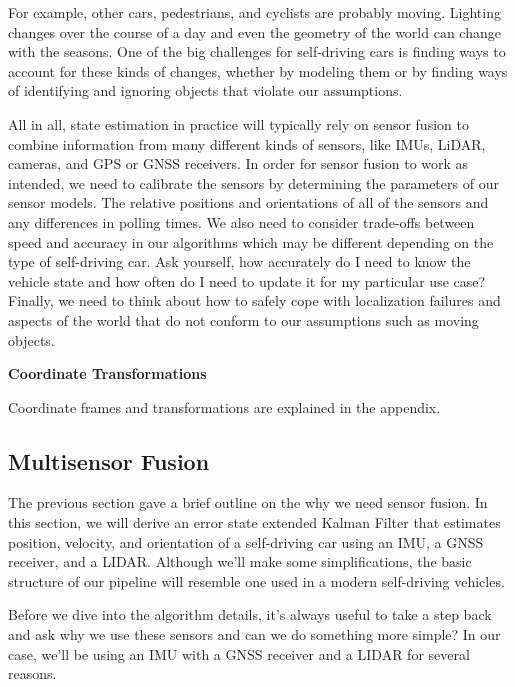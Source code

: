 For example, other cars, pedestrians, and cyclists are probably moving. Lighting changes over the course of a day and even the geometry of the world can change with the seasons. 
One of the big challenges for self-driving cars is finding ways to account for these kinds of changes, whether by modeling them or by finding ways of identifying and ignoring objects that violate our assumptions. 

All in all, state estimation in practice will typically rely on sensor fusion to combine information from many different kinds of sensors, like IMUs, LiDAR, cameras, and GPS or GNSS receivers. In order for sensor fusion to work as intended, we need to calibrate the sensors by determining the parameters of our sensor models. The relative positions and orientations of all of the sensors and any differences in polling times. We also need to consider trade-offs between speed and accuracy in our algorithms which may be different depending on the type of self-driving car. Ask yourself, how accurately do I need to know the vehicle state and how often do I need to update it for my particular use case? Finally, we need to think about how to safely cope with localization failures and aspects of the world that do not conform to our assumptions such as moving objects. 

\begin{framed}
\theoremstyle{remark}
\begin{remark}{\textbf{Coordinate Transformations}}

Coordinate frames and transformations are explained in the appendix.
\end{remark}
\end{framed}


\subsection{Multisensor Fusion}
\label{multisensor_fusion}

The previous section gave a brief outline on the why we need sensor fusion.  In this section,
we will derive an error state extended Kalman Filter that
estimates position, velocity, and orientation of a self-driving car using an IMU, a GNSS receiver,
and a LIDAR. Although we'll make some simplifications, the basic structure
of our pipeline will resemble one used in a modern self-driving vehicles. 

Before we dive into
the algorithm details, it's always useful to take a step back and ask why we use these sensors and can we do something
more simple? In our case, we'll be using an IMU with a GNSS receiver and a LIDAR for several reasons. 

